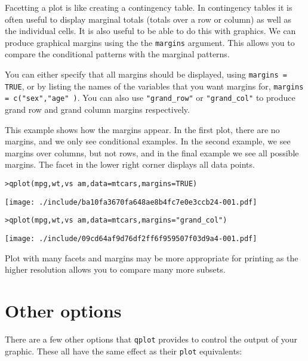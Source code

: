 Facetting a plot is like creating a contingency table.  In contingency tables it is often useful to display marginal totals (totals over a row or column) as well as the individual cells.  It is also useful to be able to do this with graphics.  We can produce graphical margins using the the {\tt margins} argument.  This allows you to compare the conditional patterns with the marginal patterns.

You can either specify that all margins should be displayed, using {\tt margins = TRUE}, or by listing the names of the variables that you want margins for, {\tt margins = c("sex","age" )}.  You can also use {\tt "grand\_row"} or {\tt "grand\_col"} to produce grand row and grand column margins respectively.

This example shows how the margins appear.  In the first plot, there are no margins, and we only see conditional examples.  In the second example, we see margins over columns, but not rows, and in the final example we see all possible margins.  The facet in the lower right corner displays all data points.

\begin{alltt}
> qplot(mpg, wt, vs ~ am, data = mtcars, margins = TRUE)
\end{alltt}
\texttt{[image: ./include/ba10fa3670fa648ae8b4fc7e0e3ccb24-001.pdf]}
\begin{alltt}

> qplot(mpg, wt, vs ~ am, data = mtcars, margins = "grand_col")
\end{alltt}
\texttt{[image: ./include/09cd64af9d76df2ff6f959507f03d9a4-001.pdf]}
\begin{alltt}

\end{alltt}%

Plot with many facets and margins may be more appropriate for printing as the higher resolution allows you to compare many more subsets.

\section{Other options}\label{sec:other_options}

There are a few other options that {\tt qplot} provides to control the output of your graphic.  These all have the same effect as their {\tt plot} equivalents:

